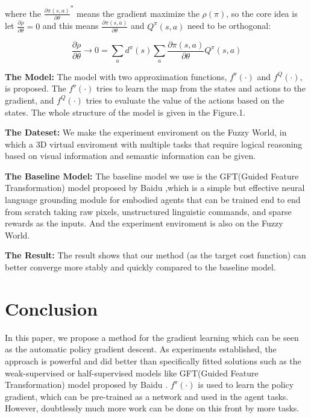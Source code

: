 \documentclass[letterpaper]{article} %
\begin{document}
where the $\frac{\partial \pi(s,a)}{\partial \theta}^*$ means the gradient maximize the $\rho(\pi)$, so the core idea is let $\frac{\partial \rho}{\partial \theta} = 0$ and this means $\frac{\partial \pi(s,a)}{\partial \theta}$ and $Q^\pi(s,a)$ need to be orthogonal:

$$\frac{\partial \rho}{\partial \theta} \rightarrow 0= \sum_{a}d^\pi(s) \sum_a \frac{\partial \pi(s,a)}{\partial \theta} Q^\pi(s,a)$$

\textbf{The Model:} The model with two approximation functions, $f^\triangledown(\cdot)$ and $f^Q(\cdot)$, is proposed. The $f^\triangledown(\cdot)$ tries to learn the map from the states and actions to the gradient, and $f^Q(\cdot)$ tries to evaluate the value of the actions based on the states. The whole structure of the model is given in the Figure.1.

\textbf{The Dateset:} We make the experiment enviroment on the Fuzzy World, in which a 3D virtual enviroment with multiple tasks that require logical reasoning based on visual information and semantic information can be given.

\textbf{The Baseline Model:} The baseline model we use is the GFT(Guided Feature Transformation) model proposed by Baidu \cite{A4},which is a simple but effective neural language grounding module for embodied agents that can be trained end to end from scratch taking raw pixels, unstructured linguistic commands, and sparse rewards as the inputs. And the experiment enviroment is also on the Fuzzy World.

\textbf{The Result:} The result shows that our method (as the target cost function) can better converge more stably and quickly compared to the baseline model.




\section{Conclusion}
In this paper, we propose a method for the gradient learning which can be seen as the automatic policy gradient descent. As experiments established, the approach is powerful and did better than specifically fitted solutions such as the weak-supervised or half-supervised models like GFT(Guided Feature Transformation) model proposed by Baidu \cite{A4}. $f^\triangledown(\cdot)$ is used to learn the policy gradient, which can be pre-trained as a network and used in the agent tasks. However, doubtlessly much more work can be done on this front by more tasks.
\end{document}
